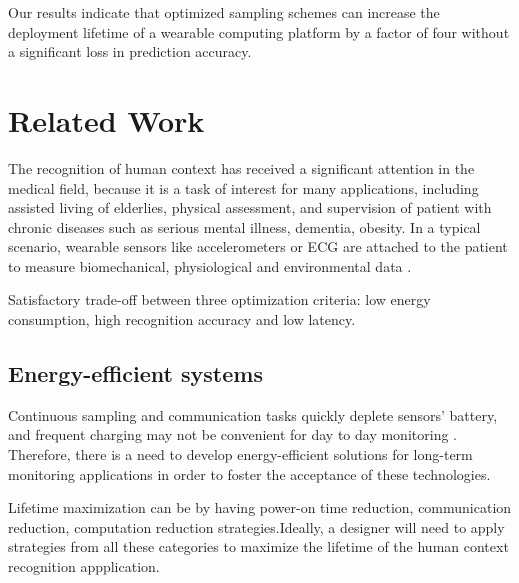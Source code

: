 \documentclass[letterpaper, 10pt, conference]{IEEEtran} %
\begin{document}
 Our results indicate that optimized sampling schemes can increase
the deployment lifetime of a wearable computing platform by a factor of four without a significant loss in prediction accuracy. 



\section{Related Work}
The recognition of human context has received a significant attention in the medical field, because it is a task of interest for many applications, including assisted living of elderlies, physical assessment, and supervision of patient with chronic diseases such as serious mental illness, dementia, obesity.  In a typical scenario, wearable sensors like accelerometers or ECG are attached to the patient to measure biomechanical, physiological and environmental data \cite{RAULT201723}.

Satisfactory trade-off between three optimization criteria: low energy consumption, high recognition accuracy and low latency.  

\subsection{Energy-efficient systems}
Continuous sampling and communication tasks quickly deplete sensors’ battery, and frequent charging may  not be convenient for day to day monitoring \cite{Rault2017}. Therefore, there is a need to develop energy-efficient solutions for long-term monitoring applications in order to foster the acceptance of these technologies.

Lifetime maximization can be by having power-on time reduction, communication reduction, computation reduction strategies.Ideally,  a designer will need to apply strategies from all
these categories to maximize the lifetime of the human context recognition appplication.
\end{document}
